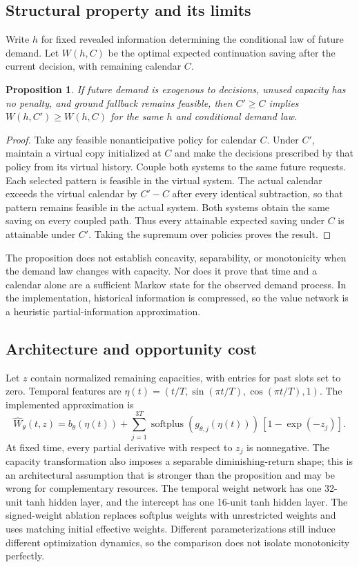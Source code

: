 \documentclass[11pt,a4paper]{article}
\newtheorem{proposition}{Proposition}
\begin{document}
\subsection{Structural property and its limits}
Write $h$ for fixed revealed information determining the conditional law of future demand. Let $W(h,C)$ be the optimal expected continuation saving after the current decision, with remaining calendar $C$.
\begin{proposition}
If future demand is exogenous to decisions, unused capacity has no penalty, and ground fallback remains feasible, then $C'\geq C$ implies $W(h,C')\geq W(h,C)$ for the same $h$ and conditional demand law.
\end{proposition}
\begin{proof}
Take any feasible nonanticipative policy for calendar $C$. Under $C'$, maintain a virtual copy initialized at $C$ and make the decisions prescribed by that policy from its virtual history. Couple both systems to the same future requests. Each selected pattern is feasible in the virtual system. The actual calendar exceeds the virtual calendar by $C'-C$ after every identical subtraction, so that pattern remains feasible in the actual system. Both systems obtain the same saving on every coupled path. Thus every attainable expected saving under $C$ is attainable under $C'$. Taking the supremum over policies proves the result.
\end{proof}
The proposition does not establish concavity, separability, or monotonicity when the demand law changes with capacity. Nor does it prove that time and a calendar alone are a sufficient Markov state for the observed demand process. In the implementation, historical information is compressed, so the value network is a heuristic partial-information approximation.

\subsection{Architecture and opportunity cost}
Let $z$ contain normalized remaining capacities, with entries for past slots set to zero. Temporal features are $\eta(t)=(t/T,\sin(\pi t/T),\cos(\pi t/T),1)$. The implemented approximation is
\begin{equation}
\widehat W_\theta(t,z)=b_\theta(\eta(t))+\sum_{j=1}^{3T}\operatorname{softplus}(g_{\theta,j}(\eta(t)))\,[1-\exp(-z_j)].
\end{equation}
At fixed time, every partial derivative with respect to $z_j$ is nonnegative. The capacity transformation also imposes a separable diminishing-return shape; this is an architectural assumption that is stronger than the proposition and may be wrong for complementary resources. The temporal weight network has one 32-unit tanh hidden layer, and the intercept has one 16-unit tanh hidden layer. The signed-weight ablation replaces softplus weights with unrestricted weights and uses matching initial effective weights. Different parameterizations still induce different optimization dynamics, so the comparison does not isolate monotonicity perfectly.
\end{document}
